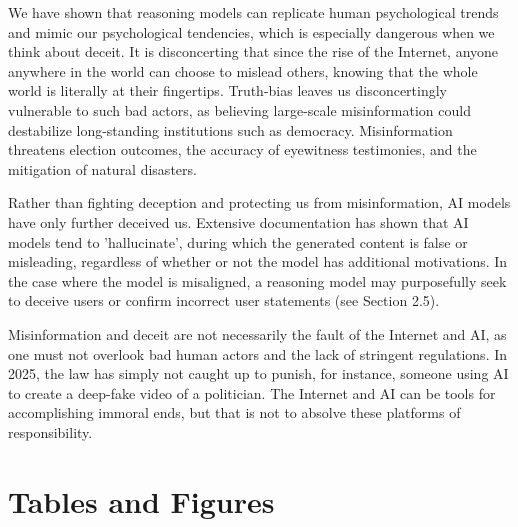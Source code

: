 \documentclass{article}
\begin{document}
We have shown that reasoning models can replicate human psychological trends and mimic our psychological tendencies, which is especially dangerous when we think about deceit. It is disconcerting that since the rise of the Internet, anyone anywhere in the world can choose to mislead others, knowing that the whole world is literally at their fingertips. Truth-bias leaves us disconcertingly vulnerable to such bad actors, as believing large-scale misinformation could destabilize long-standing institutions such as democracy. Misinformation threatens election outcomes, the accuracy of eyewitness testimonies, and the mitigation of natural disasters. 

Rather than fighting deception and protecting us from misinformation, AI models have only further deceived us. Extensive documentation has shown that AI models tend to 'hallucinate', during which the generated content is false or misleading, regardless of whether or not the model has additional motivations. In the case where the model is misaligned, a reasoning model may purposefully seek to deceive users or confirm incorrect user statements (see Section 2.5). 

Misinformation and deceit are not necessarily the fault of the Internet and AI, as one must not overlook bad human actors and the lack of stringent regulations. In 2025, the law has simply not caught up to punish, for instance, someone using AI to create a deep-fake video of a politician. The Internet and AI can be tools for accomplishing immoral ends, but that is not to absolve these platforms of responsibility.







\newpage
\appendix

\section{Tables and Figures}
\end{document}
